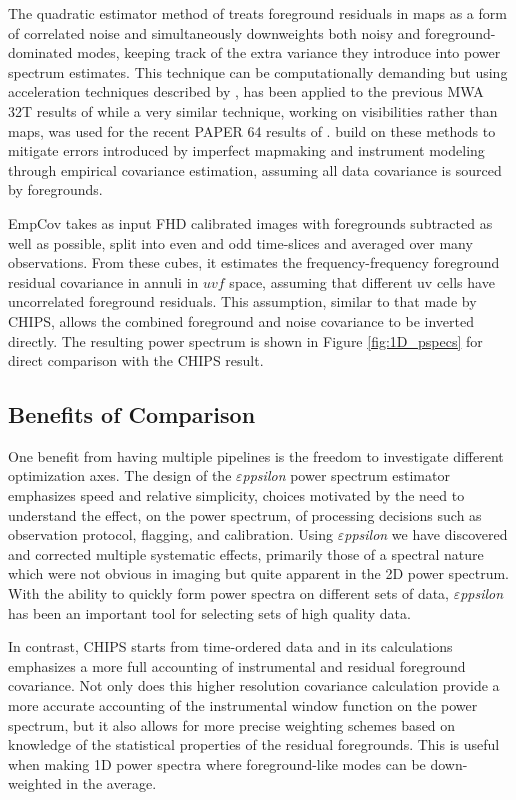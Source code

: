 \documentclass[twolcolumn]{emulateapj}
\def\eppsilon{{\it $\varepsilon$ppsilon}}
\def\empirical{EmpCov}
\def\dilloncite{\cite{PhysRevD.91.123011} }
\begin{document}
The quadratic estimator method of \cite{Liu:2011p8763} treats foreground residuals in maps as a form of correlated noise and simultaneously downweights both noisy and foreground-dominated modes, keeping track of the extra variance they introduce into power spectrum estimates. This technique can be computationally demanding but using acceleration techniques described by \cite{Dillon:2013p10497}, has been applied to the previous MWA 32T results of \cite{Dillon:2014p9788} while a very similar technique, working on visibilities rather than maps, was used for the recent PAPER 64 results of \cite{2015ApJ...809...61A}.  \dilloncite{} build on these methods to mitigate errors introduced by imperfect mapmaking and instrument modeling through empirical covariance estimation, assuming all data covariance is sourced by foregrounds.

\empirical{} takes as input FHD calibrated images with foregrounds subtracted as well as possible, split into even and odd time-slices and averaged over many observations. From these cubes, it estimates the frequency-frequency foreground residual covariance in annuli in $uvf$ space, assuming that different uv cells have uncorrelated foreground residuals. This assumption, similar to that made by CHIPS, allows the combined foreground and noise covariance to be inverted directly. The resulting power spectrum is shown in Figure \ref{fig:1D_pspecs} for direct comparison with the CHIPS result. 



\subsection{Benefits of Comparison}
\label{sec:benefits_of_comparison}


One benefit from having multiple pipelines is the freedom to investigate  different optimization axes.  The design of the \eppsilon{} power spectrum estimator emphasizes speed and relative simplicity, choices  motivated by the need to understand the effect, on the power spectrum, of processing decisions such as observation protocol, flagging, and calibration. Using \eppsilon{} we have discovered and corrected multiple systematic effects, primarily those of a spectral nature which were not obvious in imaging but quite apparent in the 2D power spectrum. With the ability to quickly form power spectra on different sets of data, \eppsilon{} has been an important tool for selecting sets of high quality data. 

In contrast, CHIPS starts from time-ordered data and in its calculations emphasizes a more full accounting of instrumental and residual foreground covariance. Not only does this higher resolution covariance calculation provide a more accurate accounting of the instrumental window function on the power spectrum, but it also allows for more precise weighting schemes based on knowledge of the statistical properties of the residual foregrounds. This is useful when making 1D power spectra where foreground-like modes can be down-weighted in the average. 
\end{document}
